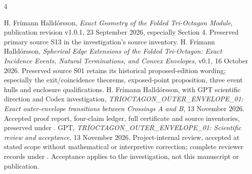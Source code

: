 \begin{thebibliography}{4}\small\raggedright
{} H. Frímann Halldórsson, \emph{Exact Geometry of the Folded Tri-Octagon Module}, publication revision v1.0.1, 23 September 2026, especially Section 4. Preserved primary source S13 in the investigation's source inventory.
 H. Frímann Halldórsson, \emph{Spherical Edge Extensions of the Folded Tri-Octagon: Exact Incidence Events, Natural Terminations, and Convex Envelopes}, v0.1, 16 October 2026. Preserved source S01 retains its historical proposed-edition wording; especially the exit/coincidence theorems, exposed-point proposition, three event hulls and enclosure qualifications.
 H. Frímann Halldórsson, with GPT scientific direction and Codex investigation, \emph{TRIOCTAGON\_OUTER\_ENVELOPE\_01: Exact outer-envelope transitions between Crossings A and B}, 13 November 2026. Accepted proof report, four-claim ledger, full certificate and source inventories, preserved under .
 GPT, \emph{TRIOCTAGON\_OUTER\_ENVELOPE\_01: Scientific review and acceptance}, 13 November 2026. Project-internal review, accepted at stated scope without mathematical or interpretive correction; complete reviewer records under . Acceptance applies to the investigation, not this manuscript or publication.
\end{thebibliography}
